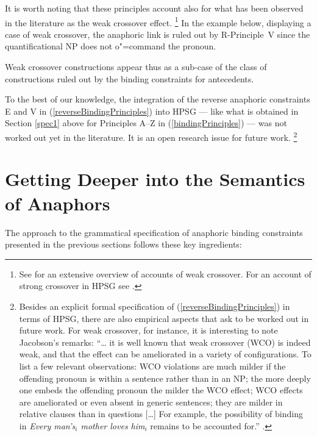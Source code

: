 \documentclass[output=paper
,modfonts
,nonflat]{langsci/langscibook}
\begin{document}
It is worth noting that these principles account also for what has been observed in the literature 
as the weak crossover effect.%
\footnote{See \citep[Sec.2.1]{jacobson:paycheck2000} for an extensive overview of 
accounts of weak crossover. For an account of strong crossover in HPSG see
\citep[p.279]{polsag:hpsg94}. }
% 
In the example below, displaying a case
of weak crossover, the anaphoric link is ruled out
by \mbox{R-Principle V} since the quantificational NP does not
o"=command the pronoun. 

\begin{exe}
\end{exe}

Weak crossover constructions
appear thus as a sub-case of the class of constructions ruled out
by the binding constraints for antecedents.

To the best of our knowledge, the integration of the reverse anaphoric constraints 
E and V in (\ref{reverseBindingPrinciples}) into HPSG ---
like what is obtained in Section \ref{spec1} above for Principles A--Z in (\ref{bindingPrinciples}) ---
was not worked out yet in the literature. It is 
an open research issue for future work.%
\footnote{
Besides an explicit formal specification of (\ref{reverseBindingPrinciples}) in terms of HPSG, 
there are also empirical aspects
that ask to be worked out in future work. 
For weak crossover, for instance, it is interesting to note Jacobson's remarks: ``\ldots{} it is well known
that weak crossover (WCO) is indeed weak, and that the effect can be
ameliorated in a variety of configurations. To list a few relevant
observations: WCO violations are much milder if the offending
pronoun is within a sentence rather than in an NP; the more deeply
one embeds the offending pronoun the milder the WCO effect;
WCO effects are ameliorated or even absent in generic sentences;
they are milder in relative clauses than in questions [\ldots] For example,
the possibility of binding in \emph{Every man's$_{i}$ mother loves him$_{i}$}
remains to be accounted for.'' \citep[p.120]{jacobson:paycheck2000}.
}
%



\section{Getting Deeper into the Semantics of Anaphors \label{outlook}}


The approach to the grammatical specification of anaphoric binding constraints
presented in the previous sections follows these key ingredients:
\end{document}
